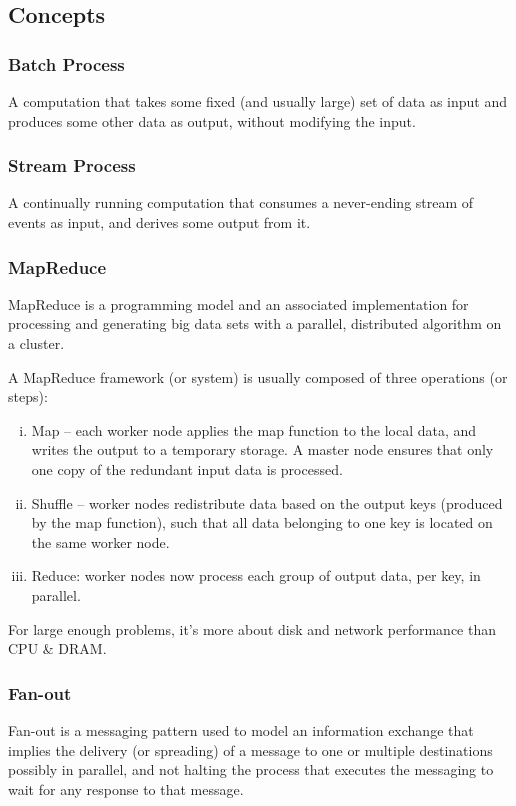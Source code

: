 \documentclass{article}
\begin{document}
    \subsection{Concepts}
    
    \subsubsection{Batch Process}
    A computation that takes some fixed (and usually large) set of data as input and produces some other data as output, without modifying the input.
    
    \subsubsection{Stream Process}
    A continually running computation that consumes a never-ending stream of events as input, and derives some output from it.
    
    \subsubsection{MapReduce}
    MapReduce is a programming model and an associated implementation for processing and generating big data sets with a parallel, distributed algorithm on a cluster.
    
    A MapReduce framework (or system) is usually composed of three operations (or steps):
    \begin{enumerate}[i.]
        \item Map -- each worker node applies the map function to the local data, and writes the output to a temporary storage. A master node ensures that only one copy of the redundant input data is processed.
        \item Shuffle -- worker nodes redistribute data based on the output keys (produced by the map function), such that all data belonging to one key is located on the same worker node.
        \item Reduce: worker nodes now process each group of output data, per key, in parallel.
    \end{enumerate}

    For large enough problems, it’s more about disk and network performance than CPU \& DRAM.
    
    \subsubsection{Fan-out}
    Fan-out is a messaging pattern used to model an information exchange that implies the delivery (or spreading) of a message to one or multiple destinations possibly in parallel, and not halting the process that executes the messaging to wait for any response to that message.
    
\end{document}
